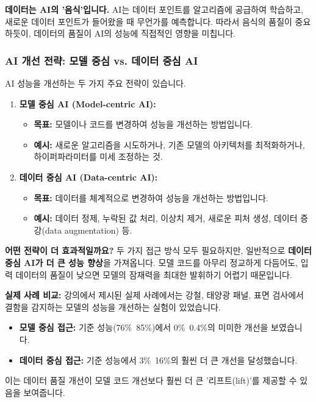 \documentclass[11pt,a4paper]{article}
\begin{document}
\begin{tipbox}
\textbf{데이터는 AI의 '음식'입니다.}
AI는 데이터 포인트를 알고리즘에 공급하여 학습하고, 새로운 데이터 포인트가 들어왔을 때 무언가를 예측합니다. 따라서 음식의 품질이 중요하듯이, 데이터의 품질이 AI의 성능에 직접적인 영향을 미칩니다.
\end{tipbox}

\subsubsection{AI 개선 전략: 모델 중심 vs. 데이터 중심 AI}
AI 성능을 개선하는 두 가지 주요 전략이 있습니다.

\begin{enumerate}
    \item \textbf{모델 중심 AI (Model-centric AI):}
    \begin{itemize}
        \item \textbf{목표:} 모델이나 코드를 변경하여 성능을 개선하는 방법입니다.
        \item \textbf{예시:} 새로운 알고리즘을 시도하거나, 기존 모델의 아키텍처를 최적화하거나, 하이퍼파라미터를 미세 조정하는 것.
    \end{itemize}

    \item \textbf{데이터 중심 AI (Data-centric AI):}
    \begin{itemize}
        \item \textbf{목표:} 데이터를 체계적으로 변경하여 성능을 개선하는 방법입니다.
        \item \textbf{예시:} 데이터 정제, 누락된 값 처리, 이상치 제거, 새로운 피처 생성, 데이터 증강(data augmentation) 등.
    \end{itemize}
\end{enumerate}

\begin{warningbox}
\textbf{어떤 전략이 더 효과적일까요?}
두 가지 접근 방식 모두 필요하지만, 일반적으로 \textbf{데이터 중심 AI가 더 큰 성능 향상}을 가져옵니다. 모델 코드를 아무리 정교하게 다듬어도, 입력 데이터의 품질이 낮으면 모델의 잠재력을 최대한 발휘하기 어렵기 때문입니다.
\end{warningbox}

\begin{examplebox}
\textbf{실제 사례 비교:}
강의에서 제시된 실제 사례에서는 강철, 태양광 패널, 표면 검사에서 결함을 감지하는 모델의 성능을 개선하는 실험이 있었습니다.
\begin{itemize}
    \item \textbf{모델 중심 접근:} 기준 성능(76\%~85\%)에서 0\%~0.4\%의 미미한 개선을 보였습니다.
    \item \textbf{데이터 중심 접근:} 기준 성능에서 3\%~16\%의 훨씬 더 큰 개선을 달성했습니다.
\end{itemize}
이는 데이터 품질 개선이 모델 코드 개선보다 훨씬 더 큰 '리프트(lift)'를 제공할 수 있음을 보여줍니다.
\end{examplebox}
\end{document}
